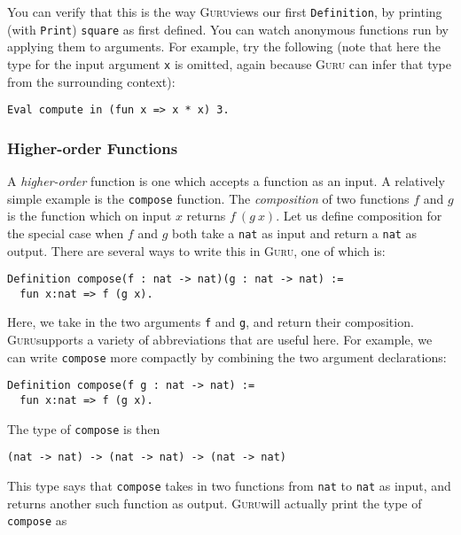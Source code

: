 \documentclass{book}[12pt]
\newcommand{\guru}[0]{\textsc{Guru}}
\begin{document}
\noindent You can verify that this is the way \guru views our first
\texttt{Definition}, by printing (with \texttt{Print}) \texttt{square}
as first defined.  You can watch anonymous functions run by applying
them to arguments.  For example, try the following (note that here the
type for the input argument \texttt{x} is omitted, again because \guru
can infer that type from the surrounding context):

\begin{verbatim}
Eval compute in (fun x => x * x) 3.
\end{verbatim}

\subsubsection{Higher-order Functions}

A \emph{higher-order} function is one which accepts a function as an
input.  A relatively simple example is the \texttt{compose} function.
The \emph{composition} of two functions $f$ and $g$ is the function
which on input $x$ returns $f\ (g\ x)$.  Let us define composition for
the special case when $f$ and $g$ both take a \texttt{nat} as input
and return a \texttt{nat} as output.  There are several ways to write
this in \guru, one of which is:

\begin{verbatim}
Definition compose(f : nat -> nat)(g : nat -> nat) := 
  fun x:nat => f (g x).
\end{verbatim}

\noindent Here, we take in the two arguments \texttt{f} and
\texttt{g}, and return their composition.  \guru supports a variety of
abbreviations that are useful here.  For example, we can write
\texttt{compose} more compactly by combining the two argument
declarations:

\begin{verbatim}
Definition compose(f g : nat -> nat) := 
  fun x:nat => f (g x).
\end{verbatim}

The type of \texttt{compose} is then

\begin{verbatim}
(nat -> nat) -> (nat -> nat) -> (nat -> nat)
\end{verbatim}

\noindent This type says that \texttt{compose} takes in two functions
from \texttt{nat} to \texttt{nat} as input, and returns another such
function as output.  \guru will actually print the type of \texttt{compose}
as 
\end{document}
